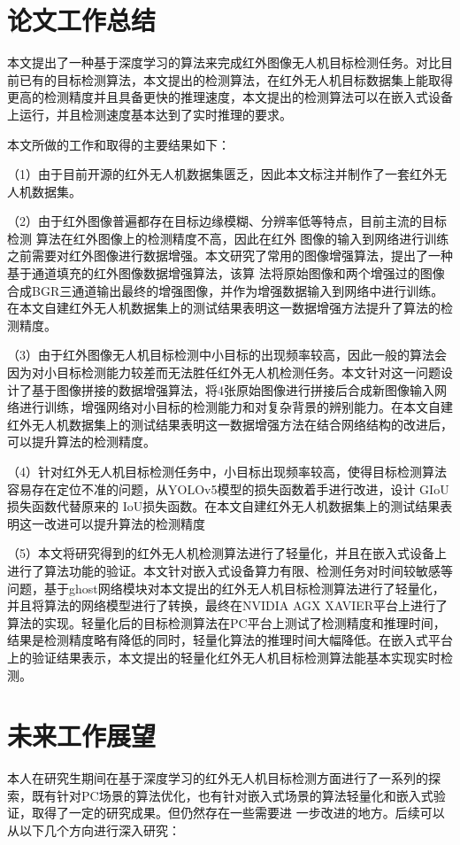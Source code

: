 \begin{conclusions}

\section{论文工作总结}
本文提出了一种基于深度学习的算法来完成红外图像无人机目标检测任务。对比目前已有的目标检测算法，本文提出的检测算法，在红外无人机目标数据集上能取得更高的检测精度并且具备更快的推理速度，本文提出的检测算法可以在嵌入式设备上运行，并且检测速度基本达到了实时推理的要求。

本文所做的工作和取得的主要结果如下：

（1）由于目前开源的红外无人机数据集匮乏，因此本文标注并制作了一套红外无人机数据集。

（2）由于红外图像普遍都存在目标边缘模糊、分辨率低等特点，目前主流的目标检测
算法在红外图像上的检测精度不高，因此在红外
图像的输入到网络进行训练之前需要对红外图像进行数据增强。本文研究了常用的图像增强算法，提出了一种基于通道填充的红外图像数据增强算法，该算
法将原始图像和两个增强过的图像合成BGR三通道输出最终的增强图像，并作为增强数据输入到网络中进行训练。在本文自建红外无人机数据集上的测试结果表明这一数据增强方法提升了算法的检测精度。

（3）由于红外图像无人机目标检测中小目标的出现频率较高，因此一般的算法会因为对小目标检测能力较差而无法胜任红外无人机检测任务。本文针对这一问题设计了基于图像拼接的数据增强算法，将4张原始图像进行拼接后合成新图像输入网络进行训练，增强网络对小目标的检测能力和对复杂背景的辨别能力。在本文自建红外无人机数据集上的测试结果表明这一数据增强方法在结合网络结构的改进后，可以提升算法的检测精度。

（4）针对红外无人机目标检测任务中，小目标出现频率较高，使得目标检测算法容易存在定位不准的问题，从YOLOv5模型的损失函数着手进行改进，设计 GIoU 损失函数代替原来的
IoU损失函数。在本文自建红外无人机数据集上的测试结果表明这一改进可以提升算法的检测精度


（5）本文将研究得到的红外无人机检测算法进行了轻量化，并且在嵌入式设备上进行了算法功能的验证。本文针对嵌入式设备算力有限、检测任务对时间较敏感等问题，基于ghost网络模块对本文提出的红外无人机目标检测算法进行了轻量化，并且将算法的网络模型进行了转换，最终在NVIDIA AGX XAVIER平台上进行了算法的实现。轻量化后的目标检测算法在PC平台上测试了检测精度和推理时间，结果是检测精度略有降低的同时，轻量化算法的推理时间大幅降低。在嵌入式平台上的验证结果表示，本文提出的轻量化红外无人机目标检测算法能基本实现实时检测。

\section{未来工作展望}
本人在研究生期间在基于深度学习的红外无人机目标检测方面进行了一系列的探
索，既有针对PC场景的算法优化，也有针对嵌入式场景的算法轻量化和嵌入式验证，取得了一定的研究成果。但仍然存在一些需要进
一步改进的地方。后续可以从以下几个方向进行深入研究：


\end{conclusions}
